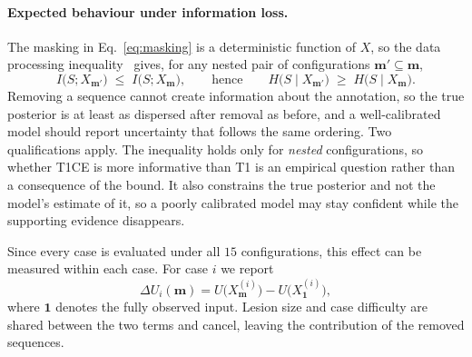 \paragraph{Expected behaviour under information loss.}
The masking in Eq.~\eqref{eq:masking} is a deterministic function of $X$, so
the data processing inequality~\cite{cover2006elements} gives, for any nested
pair of configurations $\mathbf{m}' \subseteq \mathbf{m}$,
\begin{equation}
    I\bigl(S; X_{\mathbf{m}'}\bigr) \;\le\; I\bigl(S; X_{\mathbf{m}}\bigr),
    \qquad\text{hence}\qquad
    H\bigl(S \mid X_{\mathbf{m}'}\bigr)
        \;\ge\; H\bigl(S \mid X_{\mathbf{m}}\bigr).
    \label{eq:dpi}
\end{equation}
Removing a sequence cannot create information about the annotation, so the
true posterior is at least as dispersed after removal as before, and a
well-calibrated model should report uncertainty that follows the same
ordering. Two qualifications apply. The inequality holds only for
\emph{nested} configurations, so whether T1CE is more informative than T1 is
an empirical question rather than a consequence of the bound. It also
constrains the true posterior and not the model's estimate of it, so a poorly
calibrated model may stay confident while the supporting evidence disappears.

Since every case is evaluated under all $15$ configurations, this effect can
be measured within each case. For case $i$ we report
\begin{equation}
    \Delta U_{i}(\mathbf{m})
    = U\bigl(X^{(i)}_{\mathbf{m}}\bigr) - U\bigl(X^{(i)}_{\mathbf{1}}\bigr),
    \label{eq:delta-u}
\end{equation}
where $\mathbf{1}$ denotes the fully observed input. Lesion size and case
difficulty are shared between the two terms and cancel, leaving the
contribution of the removed sequences.
